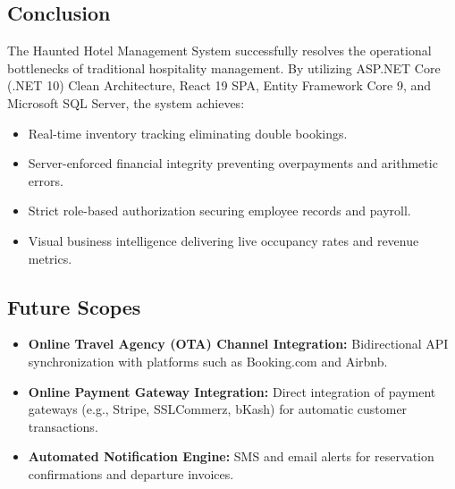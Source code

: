\documentclass[11pt,a4paper]{article}
\begin{document}
\subsection{Conclusion}
The Haunted Hotel Management System successfully resolves the operational bottlenecks of traditional hospitality management. By utilizing ASP.NET Core (.NET 10) Clean Architecture, React 19 SPA, Entity Framework Core 9, and Microsoft SQL Server, the system achieves:
\begin{itemize}[leftmargin=*]
  \item Real-time inventory tracking eliminating double bookings.
  \item Server-enforced financial integrity preventing overpayments and arithmetic errors.
  \item Strict role-based authorization securing employee records and payroll.
  \item Visual business intelligence delivering live occupancy rates and revenue metrics.
\end{itemize}

\subsection{Future Scopes}
\begin{itemize}[leftmargin=*]
  \item \textbf{Online Travel Agency (OTA) Channel Integration:} Bidirectional API synchronization with platforms such as Booking.com and Airbnb.
  \item \textbf{Online Payment Gateway Integration:} Direct integration of payment gateways (e.g., Stripe, SSLCommerz, bKash) for automatic customer transactions.
  \item \textbf{Automated Notification Engine:} SMS and email alerts for reservation confirmations and departure invoices.
\end{itemize}
\end{document}
